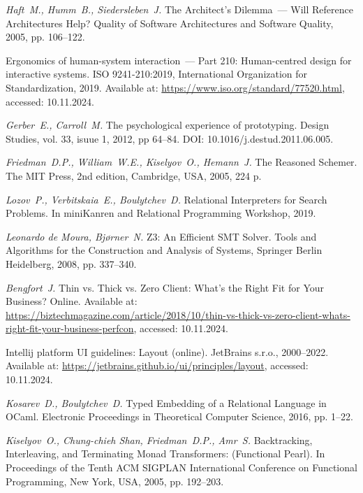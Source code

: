 {\em Haft~M., Humm~B., Siedersleben~J.} The Architect's Dilemma~--- Will Reference Architectures Help? Quality of Software Architectures and Software Quality, 2005, pp. 106--122.



Ergonomics of human-system interaction~--- Part 210: Human-centred design for interactive
systems. ISO 9241-210:2019, International Organization for Standardization, 2019. Available at: \url{https://www.iso.org/standard/77520.html}, accessed: 10.11.2024.

{\em Gerber~E., Carroll~M.} The psychological experience of prototyping. Design Studies, vol. 33, isuue 1, 2012, pp 64--84. DOI: 10.1016/j.destud.2011.06.005.

{\em Friedman~D.P., William~W.E., Kiselyov~O., Hemann~J.} The Reasoned Schemer. The MIT Press, 2nd edition, Cambridge, USA, 2005, 224 p.

{\em Lozov~P., Verbitskaia~E., Boulytchev~D.} Relational Interpreters for Search Problems. In miniKanren and Relational Programming Workshop, 2019.

{\em Leonardo de Moura, Bj{\o}rner~N.} Z3: An Efficient SMT Solver. Tools and Algorithms for the Construction and Analysis of Systems, Springer Berlin Heidelberg, 2008, pp. 337--340.

{\em Bengfort~J.} Thin vs. Thick vs. Zero Client: What's the Right Fit for Your Business? Online. Available at:
\url{https://biztechmagazine.com/article/2018/10/thin-vs-thick-vs-zero-client-whats-right-fit-your-business-perfcon}, accessed: 10.11.2024.

Intellij platform UI guidelines: Layout (online). JetBrains s.r.o., 2000--2022. Available at: \url{https://jetbrains.github.io/ui/principles/layout}, accessed: 10.11.2024.

{\em Kosarev~D., Boulytchev~D.} Typed Embedding of a Relational Language in OCaml. Electronic Proceedings in Theoretical Computer Science, 2016, pp. 1--22.

{\em Kiselyov~O., Chung-chieh Shan, Friedman~D.P., Amr~S.} Backtracking, Interleaving, and Terminating Monad Transformers: (Functional Pearl). In Proceedings of the Tenth ACM SIGPLAN International Conference on Functional Programming, New York, USA, 2005, pp. 192--203.

